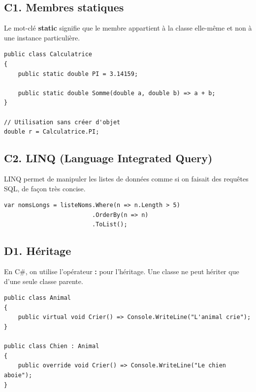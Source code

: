 \subsection*{C1. Membres statiques}
{}
\noindent Le mot-clé \textbf{static} signifie que le membre appartient à la classe elle-même et non à une instance particulière.

\vspace{0.5cm}

\begin{verbatim}
public class Calculatrice
{
    public static double PI = 3.14159;
    
    public static double Somme(double a, double b) => a + b;
}

// Utilisation sans créer d'objet
double r = Calculatrice.PI;
\end{verbatim}

\subsection*{C2. LINQ (Language Integrated Query)}
{}
\noindent LINQ permet de manipuler les listes de données comme si on faisait des requêtes SQL, de façon très concise.

\begin{verbatim}
var nomsLongs = listeNoms.Where(n => n.Length > 5)
                         .OrderBy(n => n)
                         .ToList();
\end{verbatim}

\newpage

\subsection*{D1. Héritage}
{}
\noindent En C\#, on utilise l'opérateur \textbf{:} pour l'héritage. Une classe ne peut hériter que d'une seule classe parente.

\vspace{0.5cm}

\begin{verbatim}
public class Animal 
{
    public virtual void Crier() => Console.WriteLine("L'animal crie");
}

public class Chien : Animal 
{
    public override void Crier() => Console.WriteLine("Le chien aboie");
}
\end{verbatim}

